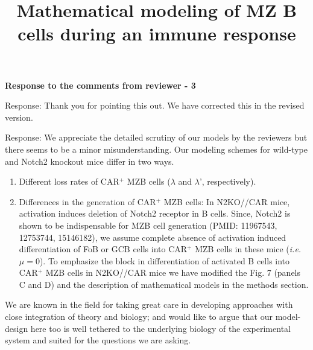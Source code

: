 \documentclass[11pt]{article}
\title{Mathematical modeling of MZ B cells during an immune response}
\author{}
\date{}
\newcommand{\gray}[1]{{\color{gray}{#1}}}
\begin{document}
 
	
\textbf{Response to the comments from reviewer - 3}

\gray{
1) Are the ``$\nu$''  parameters which appear throughout (for example in supplemental equation 1 and main text equations 2 and 6 taken to be the same). If not, can they be assigned separate symbols to avoid confusion.
}

Response: Thank you for pointing this out. We have corrected this in the revised version.


\gray{
2) It was unclear how the various processes in the model should depend on the existence of Notch2 signaling. If I correctly understood the details, aside from the decay of the CAR+MZB cells, these parameters seem to be taken to be the same for the “wild-type” and the knockout. It was not clear what the basis was for this assumption. why for example was the $\mu$ production rate not dependent on Notch2 signaling given the statement in the discussion that this signaling induces MZB development. In general, the model choices could have been connected better to the underlying biology.
} 

Response: We appreciate the detailed scrutiny of our models by the reviewers but there seems to be a minor misunderstanding.
Our modeling schemes for wild-type and Notch2 knockout mice differ in two ways.
\begin{enumerate}
\item Different loss rates of CAR$^{+}$ MZB cells ($\lambda$ and $\lambda$', respectively).
\item Differences in the generation of CAR$^{+}$ MZB cells:
In N2KO//CAR mice, activation induces deletion of Notch2 receptor in B cells.
Since, Notch2 is shown to be indispensable for MZB cell generation (PMID: 11967543, 12753744, 15146182), we assume complete absence of activation induced differentiation of FoB  or GCB cells into CAR$^{+}$ MZB cells in these mice (\textit{i.e.} $\mu=0$).
To emphasize the block in differentiation of activated B cells into CAR$^{+}$ MZB cells in N2KO//CAR mice we have modified the Fig. 7 (panels C and D) and the description of mathematical models in the methods section.
\end{enumerate} 
We are known in the field for taking great care in developing approaches with close integration of theory and biology; and would like to argue that our model-design here too is well tethered to the underlying biology of the experimental system and suited for the questions we are asking. 
\end{document}
